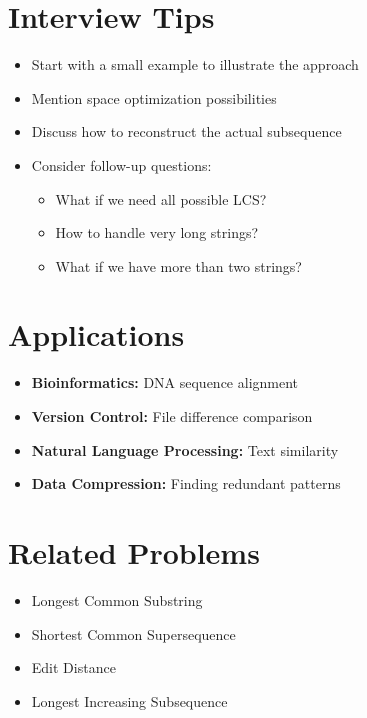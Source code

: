 \section*{Interview Tips}
\begin{itemize}
    \item Start with a small example to illustrate the approach
    \item Mention space optimization possibilities
    \item Discuss how to reconstruct the actual subsequence
    \item Consider follow-up questions:
        \begin{itemize}
            \item What if we need all possible LCS?
            \item How to handle very long strings?
            \item What if we have more than two strings?
        \end{itemize}
\end{itemize}

\section*{Applications}
\begin{itemize}
    \item \textbf{Bioinformatics:} DNA sequence alignment
    \item \textbf{Version Control:} File difference comparison
    \item \textbf{Natural Language Processing:} Text similarity
    \item \textbf{Data Compression:} Finding redundant patterns
\end{itemize}

\section*{Related Problems}
\begin{itemize}
    \item Longest Common Substring
    \item Shortest Common Supersequence
    \item Edit Distance
    \item Longest Increasing Subsequence
\end{itemize}